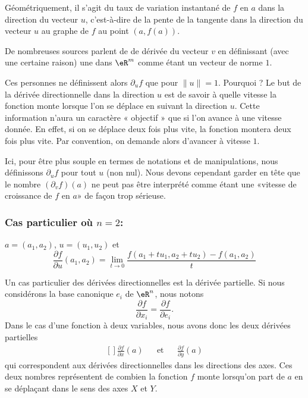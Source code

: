Géométriquement, il s'agit du taux de variation instantané de $f$ en $a$ dans la direction du vecteur $u$, c'est-à-dire de la pente de la tangente dans la direction du vecteur $u$ au graphe de $f$ au point $(a, f(a))$.

\begin{remark}
    De nombreuses sources parlent de de dérivée  du vecteur $v$ en définissant (avec une certaine raison) une  dans $\eR^m$ comme étant un vecteur de norme $1$.

    Ces personnes ne définissent alors \( \partial_uf\) que pour \( \| u \|=1\). Pourquoi ? Le but de la dérivée directionnelle dans la direction $u$ est de savoir à quelle vitesse la fonction monte lorsque l'on se déplace en suivant la direction $u$. Cette information n'aura un caractère « objectif » que si l'on avance à une vitesse donnée. En effet, si on se déplace deux fois plus vite, la fonction montera deux fois plus vite. Par convention, on demande alors d'avancer à vitesse \( 1\).

    Ici, pour être plus souple en termes de notations et de manipulations, nous définissons \( \partial_uf\) pour tout \( u\) (non nul). Nous devons cependant garder en tête que le nombre \( (\partial_vf)(a)\) ne peut pas être interprété comme étant une «vitesse de croissance de \( f\) en \( a\)» de façon trop sérieuse.
\end{remark}

\subsubsection*{Cas particulier où $n=2$:} $a = (a_1, a_2)$, $u =
(u_1,u_2)$ et
$$\frac{\partial f}{\partial u}(a_1, a_2) = \lim_{t\rightarrow
0}\frac{f(a_1+tu_1,a_2+tu_2) - f(a_1, a_2)}{t}$$

Un cas particulier des dérivées directionnelles est la dérivée partielle. Si nous considérons la base canonique $e_i$ de $\eR^n$, nous notons
\begin{equation}
    \frac{ \partial f }{ \partial x_i }=\frac{ \partial f }{ \partial e_i }.
\end{equation}
Dans le cas d'une fonction à deux variables, nous avons donc les deux dérivées partielles
\begin{equation}
    \begin{aligned}[]
        \frac{ \partial f }{ \partial x }(a)&&\text{et}&&\frac{ \partial f }{ \partial y }(a)
    \end{aligned}
\end{equation}
qui correspondent aux dérivées directionnelles dans les directions des axes. Ces deux nombres représentent de combien la fonction $f$ monte lorsqu'on part de $a$ en se déplaçant dans le sens des axes $X$ et $Y$.

